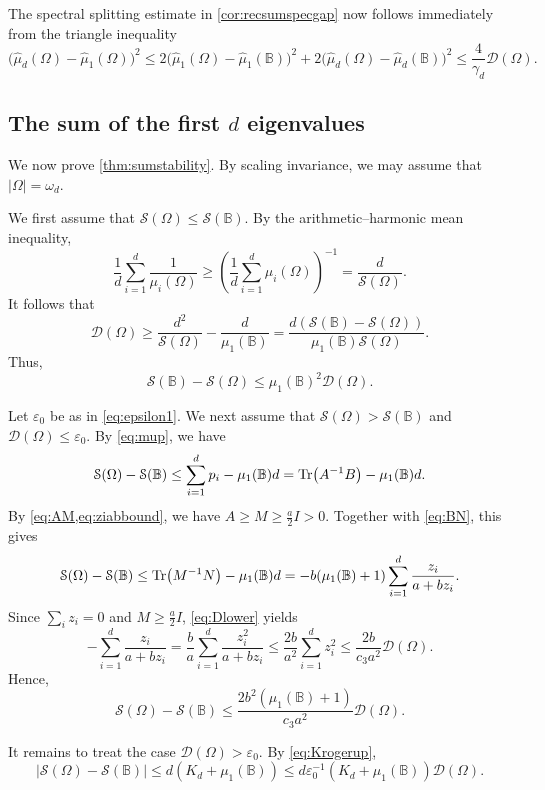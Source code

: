 \documentclass{amsart}
\numberwithin{equation}{section}
\theoremstyle{plain}
\theoremstyle{definition}
\theoremstyle{plain}
\theoremstyle{remark}
\numberwithin{figure}{section}
\newcommand{\B}{\mathbb{B}}
\newcommand{\muu}{\widehat{\mu}}
\newcommand{\D}{\mathcal{D}(\Omega)}
\newcommand{\s}{\mathcal{S}(\Omega)}
\begin{document}
The spectral splitting estimate in \cref{cor:recsumspecgap} now follows immediately from the triangle inequality
\[
    \big(\muu_d(\Omega)-\muu_1(\Omega)\big)^2 \leq 2\big(\muu_1(\Omega)-\muu_1(\B)\big)^2 + 2\big(\muu_d(\Omega)-\muu_d(\B)\big)^2 \leq \frac{4}{\gamma_d} \D.
\]


\subsection{The sum of the first \texorpdfstring{$d$}{d} eigenvalues}

We now prove \cref{thm:sumstability}. By scaling invariance, we may assume that $|\Omega|=\omega_d$. 

We first assume that $\s\leq \mathcal{S}(\B) $. By the arithmetic--harmonic mean inequality,
\[
    \frac{1}{d}\sum_{i=1}^d\frac{1}{\mu_i(\Omega)} \geq \left( \frac{1}{d}\sum_{i=1}^d\mu_i(\Omega) \right)^{-1} = \frac{d}{\s}.
\]
It follows that
\[
    \D \geq \frac{d^2}{\s} - \frac{d}{\mu_1(\B)} = \frac{d (\mathcal{S}(\B)-\s)}{\mu_1(\B) \s}.
\]
Thus,
\begin{equation}
    \label{eq:negativeside}
    \mathcal{S}(\B)-\s \leq \mu_1(\B)^2\D.
\end{equation}

Let $\varepsilon_0$ be as in \cref{eq:epsilon1}. We next assume that $\s> \mathcal{S}(\B) $ and $\D\leq \varepsilon_0$. By \cref{eq:mup}, we have
\[
    \s- \mathcal{S}(\B)  \leq \sum_{i=1}^d p_i- \mu_1(\B) d  = \Tr (A^{-1}B)- \mu_1(\B) d .
\]
By \cref{eq:AM,eq:ziabbound}, we have $A\geq M\geq \frac{a}{2}I>0$. Together with \cref{eq:BN}, this gives
\[
    \s- \mathcal{S}(\B)  \leq \Tr (M^{-1}N)- \mu_1(\B) d= -b(\mu_1(\B)+1) \sum_{i=1}^d \frac{z_i}{a+bz_i}.
\]
Since $\sum_i z_i=0$ and $M\geq \frac{a}{2}I$, \cref{eq:Dlower} yields
\[
    -\sum_{i=1}^d \frac{z_i}{a+bz_i} = \frac{b}{a} \sum_{i=1}^d \frac{z_i^2}{a+bz_i} \leq \frac{2b}{a^2} \sum_{i=1}^d z_i^2 \leq \frac{2b}{c_3 a^2}\D.
\]
Hence,
\begin{equation}
    \label{eq:positiveside}
    \s- \mathcal{S}(\B)  \leq \frac{2b^2(\mu_1(\B)+1)}{c_3 a^2}\D.
\end{equation}

It remains to treat the case $\D>\varepsilon_0$. By \cref{eq:Krogerup},
\begin{equation}
    \label{eq:largedeficit}
    |\s- \mathcal{S}(\B) | \leq d(K_d+\mu_1(\B)) \leq d\varepsilon_0^{-1}(K_d+\mu_1(\B))\D.
\end{equation}
\end{document}
